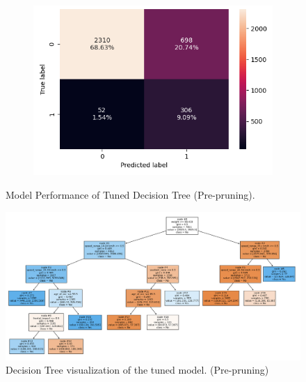 \documentclass[12pt,a4paper]{article}
\begin{document}
\begin{figure}[h]
\begin{subfigure}[t]{0.45\textwidth}
			\includegraphics[width=\textwidth]{dTree_c_Matrix_test.png}
			\caption{}
			\label{fig:dTree_c_Matrix_test}
		\end{subfigure}
		\caption{Model Performance of Tuned Decision Tree (Pre-pruning).}
		\label{fig:Model Performance of Decision Tree}
	\end{figure}
	\begin{figure}[h]
	\centering
	\includegraphics[width=0.7\linewidth]{dTree_vis.png}
	\caption{Decision Tree visualization of the tuned model. (Pre-pruning)}
	\label{fig:dTree_vis}
	\end{figure}
	
\end{document}

